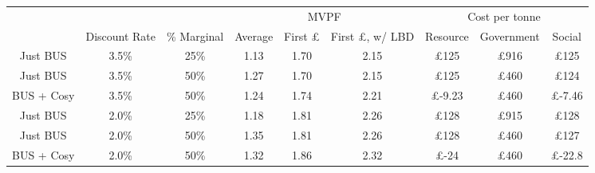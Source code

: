 
\begin{tabular}{ccccccccc}
\toprule
\multicolumn{3}{c}{ } & \multicolumn{3}{c}{MVPF} & \multicolumn{3}{c}{Cost per tonne} \\
\cmidrule(l{3pt}r{3pt}){4-6} \cmidrule(l{3pt}r{3pt}){7-9}
 & Discount Rate & \%
Marginal & Average & First £ & First £, w/ LBD & Resource & Government & Social\\
\midrule
Just BUS & 3.5\% & 25\% & 1.13 & 1.70 & 2.15 & £125 & £916 & £125\\
Just BUS & 3.5\% & 50\% & 1.27 & 1.70 & 2.15 & £125 & £460 & £124\\
BUS + Cosy & 3.5\% & 50\% & 1.24 & 1.74 & 2.21 & £-9.23 & £460 & £-7.46\\
\midrule
Just BUS & 2.0\% & 25\% & 1.18 & 1.81 & 2.26 & £128 & £915 & £128\\
Just BUS & 2.0\% & 50\% & 1.35 & 1.81 & 2.26 & £128 & £460 & £127\\
\addlinespace
BUS + Cosy & 2.0\% & 50\% & 1.32 & 1.86 & 2.32 & £-24 & £460 & £-22.8\\
\bottomrule
\end{tabular}
